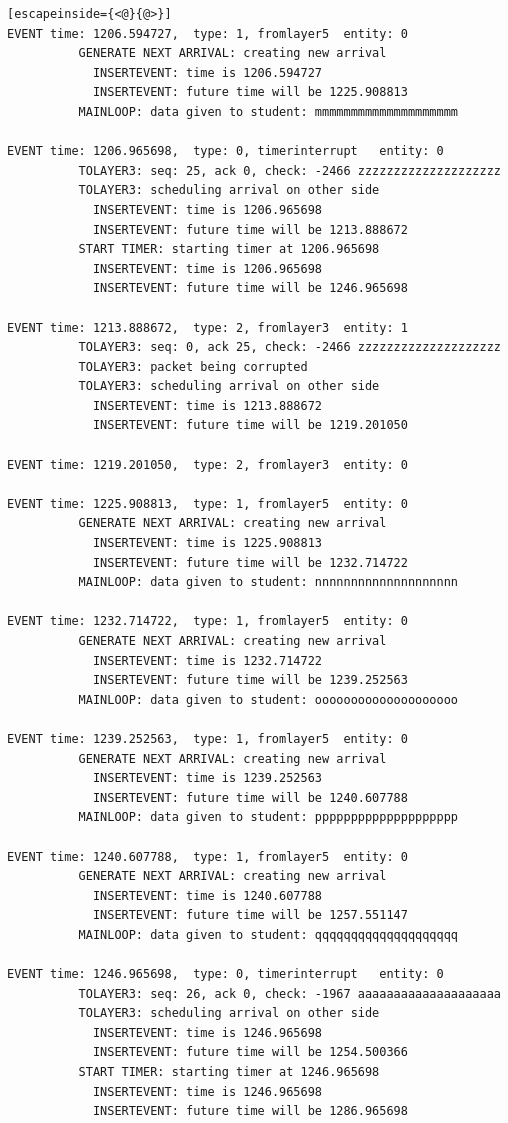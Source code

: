 \documentclass[paper=a4, fontsize=11pt]{scrartcl}
\numberwithin{equation}{section}		%
\numberwithin{figure}{section}			%
\numberwithin{table}{section}				%
\begin{document}
\begin{lstlisting}[escapeinside={<@}{@>}]
EVENT time: 1206.594727,  type: 1, fromlayer5  entity: 0
          GENERATE NEXT ARRIVAL: creating new arrival
            INSERTEVENT: time is 1206.594727
            INSERTEVENT: future time will be 1225.908813
          MAINLOOP: data given to student: mmmmmmmmmmmmmmmmmmmm

EVENT time: 1206.965698,  type: 0, timerinterrupt   entity: 0
          TOLAYER3: seq: 25, ack 0, check: -2466 zzzzzzzzzzzzzzzzzzzz
          TOLAYER3: scheduling arrival on other side
            INSERTEVENT: time is 1206.965698
            INSERTEVENT: future time will be 1213.888672
          START TIMER: starting timer at 1206.965698
            INSERTEVENT: time is 1206.965698
            INSERTEVENT: future time will be 1246.965698

EVENT time: 1213.888672,  type: 2, fromlayer3  entity: 1
          TOLAYER3: seq: 0, ack 25, check: -2466 zzzzzzzzzzzzzzzzzzzz
          TOLAYER3: packet being corrupted
          TOLAYER3: scheduling arrival on other side
            INSERTEVENT: time is 1213.888672
            INSERTEVENT: future time will be 1219.201050

EVENT time: 1219.201050,  type: 2, fromlayer3  entity: 0

EVENT time: 1225.908813,  type: 1, fromlayer5  entity: 0
          GENERATE NEXT ARRIVAL: creating new arrival
            INSERTEVENT: time is 1225.908813
            INSERTEVENT: future time will be 1232.714722
          MAINLOOP: data given to student: nnnnnnnnnnnnnnnnnnnn

EVENT time: 1232.714722,  type: 1, fromlayer5  entity: 0
          GENERATE NEXT ARRIVAL: creating new arrival
            INSERTEVENT: time is 1232.714722
            INSERTEVENT: future time will be 1239.252563
          MAINLOOP: data given to student: oooooooooooooooooooo

EVENT time: 1239.252563,  type: 1, fromlayer5  entity: 0
          GENERATE NEXT ARRIVAL: creating new arrival
            INSERTEVENT: time is 1239.252563
            INSERTEVENT: future time will be 1240.607788
          MAINLOOP: data given to student: pppppppppppppppppppp

EVENT time: 1240.607788,  type: 1, fromlayer5  entity: 0
          GENERATE NEXT ARRIVAL: creating new arrival
            INSERTEVENT: time is 1240.607788
            INSERTEVENT: future time will be 1257.551147
          MAINLOOP: data given to student: qqqqqqqqqqqqqqqqqqqq

EVENT time: 1246.965698,  type: 0, timerinterrupt   entity: 0
          TOLAYER3: seq: 26, ack 0, check: -1967 aaaaaaaaaaaaaaaaaaaa
          TOLAYER3: scheduling arrival on other side
            INSERTEVENT: time is 1246.965698
            INSERTEVENT: future time will be 1254.500366
          START TIMER: starting timer at 1246.965698
            INSERTEVENT: time is 1246.965698
            INSERTEVENT: future time will be 1286.965698


\end{lstlisting}
\end{document}
